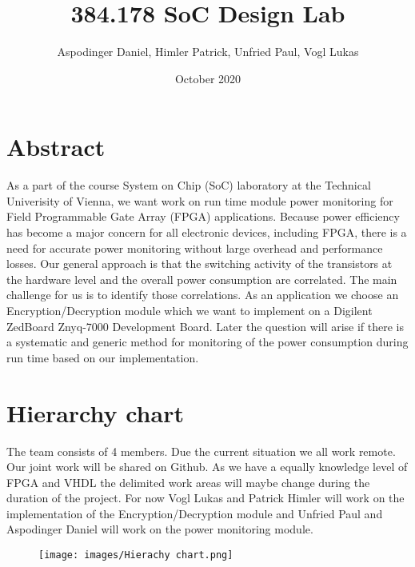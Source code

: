 \documentclass{article}
\title{384.178 SoC Design Lab}
\author{Aspodinger Daniel, Himler Patrick, Unfried Paul, Vogl Lukas }
\date{October 2020}
\begin{document}
\maketitle

\section{Abstract}

As a part of the course System on Chip (SoC) laboratory at the Technical Univerisity of Vienna, we want work on run time module power monitoring for Field Programmable Gate Array (FPGA) applications. Because power efficiency has become a major concern for all electronic devices, including FPGA, there is a need for accurate power monitoring without large overhead and performance losses. Our general approach is that the switching activity of the transistors at the hardware level and the overall power consumption are correlated. The main challenge for us is to identify those correlations. As an application we choose an Encryption/Decryption module which we want to implement on a Digilent ZedBoard Znyq-7000 Development Board. Later the question will arise if there is a systematic and generic method for monitoring of the power consumption during run time based on our implementation.

\section{Hierarchy chart}

The team consists of 4 members. Due the current situation we all work remote. Our joint work will be shared on Github. As we have a equally knowledge level of FPGA and VHDL the delimited work areas will maybe change during the duration of the project. For now Vogl Lukas and Patrick Himler will work on the implementation of the Encryption/Decryption module and Unfried Paul and Aspodinger Daniel will work on the power monitoring module.


\begin{figure}[h]
\texttt{[image: images/Hierachy chart.png]}
\centering
\end{figure}
\end{document}
